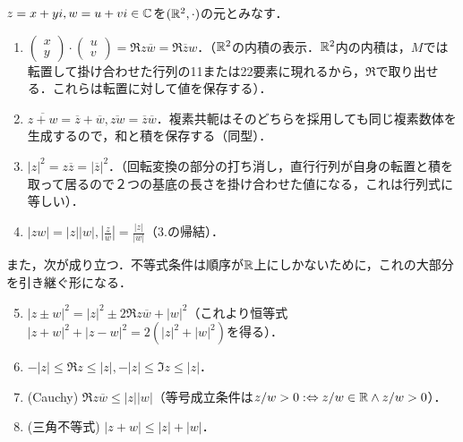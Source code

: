 \documentclass[uplatex, dvipdfmx]{jsreport}
\begin{document}
\begin{lemma}\label{lemma-abs-conj}
    $z=x+yi, w=u+vi\in\mathbb{C}$を$(\mathbb{R}^2,\cdot)$の元とみなす．
    \begin{enumerate}
        \item $\begin{pmatrix}x\\y\end{pmatrix}\cdot\begin{pmatrix}u\\v\end{pmatrix} = \Re z\overline{w}=\Re \overline{z}w$．（$\mathbb{R}^2$の内積の表示．$\mathbb{R}^2$内の内積は，$M$では転置して掛け合わせた行列の11または22要素に現れるから，$\Re$で取り出せる．これらは転置に対して値を保存する）．
        \item $\overline{z+w}=\overline{z}+\overline{w}, \overline{zw}=\overline{z}\overline{w}$．複素共軛はそのどちらを採用しても同じ複素数体を生成するので，和と積を保存する（同型）．
        \item $|z|^2=z\overline{z}=|\overline{z}|^2$．（回転変換の部分の打ち消し，直行行列が自身の転置と積を取って居るので２つの基底の長さを掛け合わせた値になる，これは行列式に等しい）．
        \item $|zw|=|z||w|, \left|\frac{z}{w}\right|=\frac{|z|}{|w|}$（3.の帰結）．
    \end{enumerate}
    また，次が成り立つ．不等式条件は順序が$\mathbb{R}$上にしかないために，これの大部分を引き継ぐ形になる．
    \begin{enumerate}\setcounter{enumi}{4}
        \item $|z\pm w|^2=|z|^2\pm 2\Re z\overline{w}+|w|^2$（これより恒等式$|z+w|^2+|z-w|^2=2(|z|^2+|w|^2)$を得る）．
        \item $-|z|\le\Re z\le|z|,-|z|\le\Im z\le |z|$．
        \item (Cauchy) $\Re z\overline{w}\le|z||w|$（等号成立条件は$z/w>0:\Leftrightarrow z/w\in\mathbb{R}\land z/w>0$）．
        \item (三角不等式) $|z+w|\le|z|+|w|$．
    \end{enumerate}
\end{lemma}
\end{document}
